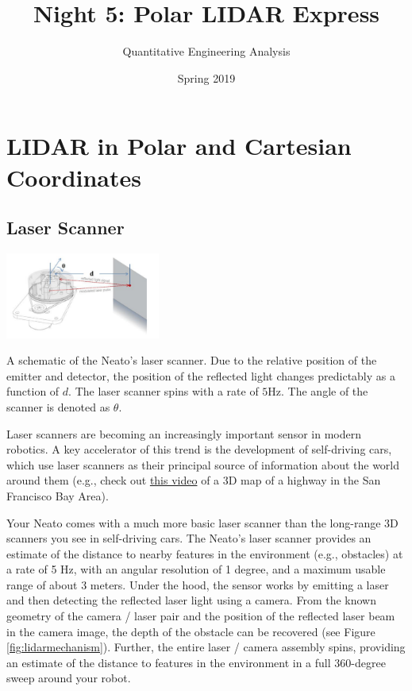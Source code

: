 \documentclass[M3_Night5_Solutions]{subfiles}
\title{Night 5: Polar LIDAR Express}
\author{Quantitative Engineering Analysis}
\date{Spring 2019}
\begin{document}
\maketitle
\thispagestyle{firstpage}


\section{LIDAR in Polar and Cartesian Coordinates}
\subsection{Laser Scanner}

\begin{marginfigure}
\includegraphics[width=2in]{figs/mechanism}
\caption{A schematic of the Neato's laser scanner.  Due to the relative position of the emitter and detector, the position of the reflected light changes  predictably as a function of $d$.  The laser scanner spins with a rate of $5$Hz.  The angle of the scanner is denoted as $\theta$.\label{fig:lidarmechanism}}
\end{marginfigure}

Laser scanners are becoming an increasingly important sensor in modern robotics.  A key accelerator of this trend is the development of self-driving cars, which use laser scanners as their principal source of information about the world around them (e.g., check out \href{https://www.youtube.com/watch?v=KQpwVCNAmpE}{this video} of a 3D map of a highway in the San Francisco Bay Area).

Your Neato comes with a much more basic laser scanner than the long-range 3D scanners you see in self-driving cars.  The Neato's laser scanner provides an estimate of the distance to nearby features in the environment (e.g., obstacles) at a rate of 5 Hz, with an angular resolution of 1 degree, and a maximum usable range of about 3 meters.  Under the hood, the sensor works by emitting a laser and then detecting the reflected laser light using a camera.  From the known geometry of the camera / laser pair and the position of the reflected laser beam in the camera image, the depth of the obstacle can be recovered (see Figure \ref{fig:lidarmechanism}).  Further, the entire laser / camera assembly spins, providing an estimate of the distance to features in the environment in a full 360-degree sweep around your robot.
\end{document}
